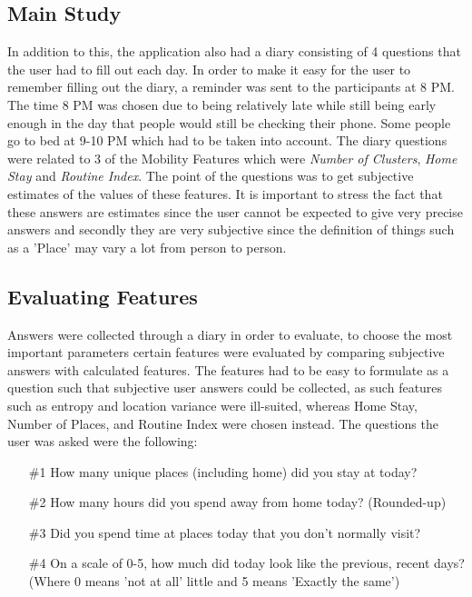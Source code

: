 \subsection{Main Study}
In addition to this, the application also had a diary consisting of 4 questions that the user had to fill out each day. In order to make it easy for the user to remember filling out the diary, a reminder was sent to the participants at 8 PM. The time 8 PM was chosen due to being relatively late while still being early enough in the day that people would still be checking their phone. Some people go to bed at 9-10 PM which had to be taken into account. The diary questions were related to 3 of the Mobility Features which were \textit{Number of Clusters}, \textit{Home Stay} and \textit{Routine Index}. The point of the questions was to get subjective estimates of the values of these features. It is important to stress the fact that these answers are estimates since the user cannot be expected to give very precise answers and secondly they are very subjective since the definition of things such as a 'Place' may vary a lot from person to person.

\subsection{Evaluating Features}
Answers were collected through a diary in order to evaluate, to choose the most important parameters certain features were evaluated by comparing subjective answers with calculated features. The features had to be easy to formulate as a question such that subjective user answers could be collected, as such features such as entropy and location variance were ill-suited, whereas Home Stay, Number of Places, and Routine Index were chosen instead. The questions the user was asked were the following:

\begin{itemize}
    \item[\#1] How many unique places (including home) did you stay at today?
    \item[\#2] How many hours did you spend away from home today? (Rounded-up)
    \item[\#3] Did you spend time at places today that you don't normally visit?
    \item[\#4] On a scale of 0-5, how much did today look like the previous, recent days? (Where 0 means 'not at all' little and 5 means 'Exactly the same')
\end{itemize}

